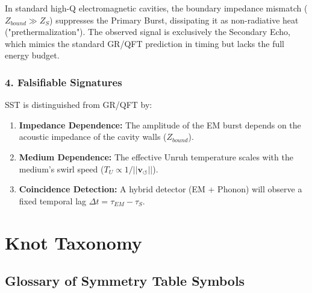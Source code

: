                 In standard high-Q electromagnetic cavities, the boundary impedance mismatch ($Z_{bound} \gg Z_S$) suppresses the Primary Burst, dissipating it as non-radiative heat ("prethermalization"). The observed signal is exclusively the Secondary Echo, which mimics the standard GR/QFT prediction in timing but lacks the full energy budget.



            \subsubsection*{\textbf{4. Falsifiable Signatures}}


                SST is distinguished from GR/QFT by:

                \begin{enumerate}
                        \item \textbf{Impedance Dependence:} The amplitude of the EM burst depends on the acoustic impedance of the cavity walls ($Z_{bound}$).


                        \item \textbf{Medium Dependence:} The effective Unruh temperature scales with the medium's swirl speed ($T_U \propto 1/||\mathbf{v}_{\circlearrowleft}||$).


                        \item \textbf{Coincidence Detection:} A hybrid detector (EM + Phonon) will observe a fixed temporal lag $\Delta t = \tau_{EM} - \tau_S$.


                \end{enumerate}

    \section{Knot Taxonomy}
    \subsection{Glossary of Symmetry Table Symbols}
        \label{sec:glossary-of-symmetry-table-symbols}

